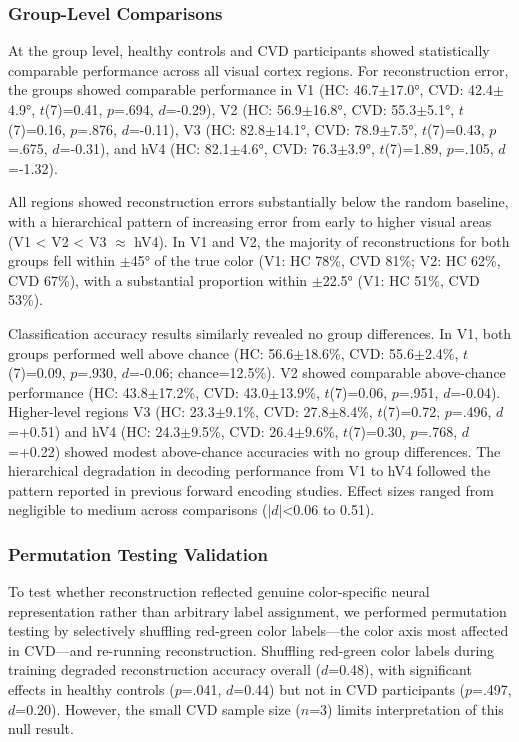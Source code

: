 \documentclass[12pt,a4paper]{article}
\begin{document}
\subsubsection{Group-Level Comparisons}

At the group level, healthy controls and CVD participants showed statistically comparable performance across all visual cortex regions. For reconstruction error, the groups showed comparable performance in V1 (HC: 46.7$\pm$17.0°, CVD: 42.4$\pm$4.9°, $t$(7)=0.41, $p$=.694, $d$=-0.29), V2 (HC: 56.9$\pm$16.8°, CVD: 55.3$\pm$5.1°, $t$(7)=0.16, $p$=.876, $d$=-0.11), V3 (HC: 82.8$\pm$14.1°, CVD: 78.9$\pm$7.5°, $t$(7)=0.43, $p$=.675, $d$=-0.31), and hV4 (HC: 82.1$\pm$4.6°, CVD: 76.3$\pm$3.9°, $t$(7)=1.89, $p$=.105, $d$=-1.32).

All regions showed reconstruction errors substantially below the random baseline, with a hierarchical pattern of increasing error from early to higher visual areas (V1 < V2 < V3 $\approx$ hV4). In V1 and V2, the majority of reconstructions for both groups fell within $\pm$45° of the true color (V1: HC 78\%, CVD 81\%; V2: HC 62\%, CVD 67\%), with a substantial proportion within $\pm$22.5° (V1: HC 51\%, CVD 53\%).

Classification accuracy results similarly revealed no group differences. In V1, both groups performed well above chance (HC: 56.6$\pm$18.6\%, CVD: 55.6$\pm$2.4\%, $t$(7)=0.09, $p$=.930, $d$=-0.06; chance=12.5\%). V2 showed comparable above-chance performance (HC: 43.8$\pm$17.2\%, CVD: 43.0$\pm$13.9\%, $t$(7)=0.06, $p$=.951, $d$=-0.04). Higher-level regions V3 (HC: 23.3$\pm$9.1\%, CVD: 27.8$\pm$8.4\%, $t$(7)=0.72, $p$=.496, $d$=+0.51) and hV4 (HC: 24.3$\pm$9.5\%, CVD: 26.4$\pm$9.6\%, $t$(7)=0.30, $p$=.768, $d$=+0.22) showed modest above-chance accuracies with no group differences. The hierarchical degradation in decoding performance from V1 to hV4 followed the pattern reported in previous forward encoding studies. Effect sizes ranged from negligible to medium across comparisons ($|d|$<0.06 to 0.51).

\subsubsection{Permutation Testing Validation}

To test whether reconstruction reflected genuine color-specific neural representation rather than arbitrary label assignment, we performed permutation testing by selectively shuffling red-green color labels—the color axis most affected in CVD—and re-running reconstruction. Shuffling red-green color labels during training degraded reconstruction accuracy overall ($d$=0.48), with significant effects in healthy controls ($p$=.041, $d$=0.44) but not in CVD participants ($p$=.497, $d$=0.20). However, the small CVD sample size ($n$=3) limits interpretation of this null result.
\end{document}
